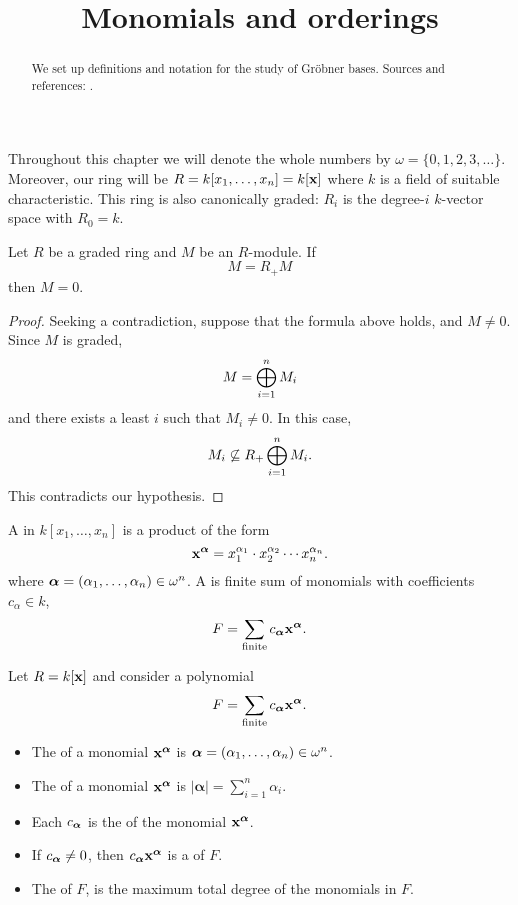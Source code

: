 \documentclass{ximera}
\title{Monomials and orderings}
\begin{document}
\begin{abstract}
  We set up definitions and notation for the study of Gr\"obner 
  bases. Sources and references: \cite{CLO2007}.
\end{abstract}
\maketitle

Throughout this chapter we will denote the whole numbers by $\omega =
\{0,1,2,3,\dots\}$. Moreover, our ring will be $R=k[x_1,\dots,x_n] =
k[\mathbf{x}]$ where $k$ is a field of suitable characteristic. This ring is
also canonically graded: $R_i$ is the degree-$i$ $k$-vector space with
$R_0=k$.

\begin{theorem}
  Let $R$ be a graded ring and $M$ be an $R$-module. If
  \[
  M = R_+ M 
  \]
  then $M=0$.
  \begin{proof}
    Seeking a contradiction, suppose that the formula above holds, and
    $M\ne0$. Since $M$ is graded,
    \[
    M = \bigoplus_{i=1}^n M_i
    \]
    and there exists a least $i$ such that $M_i \ne 0$. In this case,
    \[
    M_i \not\subseteq R_+\bigoplus_{i=1}^n M_i.
    \]
    This contradicts our hypothesis.
  \end{proof}
\end{theorem}

\begin{definition}
  A  in $k[x_1,\dots,x_n]$ is a product of the form
  \[
  \mathbf{x}^{{\boldsymbol\alpha}} = x_1^{\alpha_1}\cdot x_2^{\alpha_2}  \cdots x_n^{\alpha_n}.
  \]
  where ${\boldsymbol\alpha} = (\alpha_1,\dots,\alpha_n) \in
  \omega^n$.  A  is finite sum of monomials with
  coefficients $c_\alpha\in k$,
  \[
  F = \sum_{\mathrm{finite}} c_{{\boldsymbol\alpha}} \mathbf{x}^{{\boldsymbol\alpha}}.
  \]
\end{definition}


\begin{definition}
  Let $R = k[\mathbf{x}]$ and consider a polynomial
  \[
  F =  \sum_{\mathrm{finite}} c_{{\boldsymbol\alpha}} \mathbf{x}^{{\boldsymbol\alpha}}.
  \]
  \begin{itemize}
    \item The  of a monomial $\mathbf{x}^{{\boldsymbol\alpha}}$ is
      ${\boldsymbol\alpha}=(\alpha_1,\dots,\alpha_n)\in \omega^n$.
    \item The  of a monomial $\mathbf{x}^{{\boldsymbol\alpha}}$ is
      $|\boldsymbol{\alpha}| = \sum_{i=1}^n \alpha_i$.
    \item Each $c_{{\boldsymbol\alpha}}$ is the  of the
      monomial $\mathbf{x}^{{\boldsymbol\alpha}}$.
    \item If $c_{{\boldsymbol\alpha}} \ne 0$, then
      $c_{{\boldsymbol\alpha}}\mathbf{x}^{{\boldsymbol\alpha}}$ is a  of
      $F$.
    \item The  of $F$, is the maximum total degree
      of the monomials in $F$.
  \end{itemize}
\end{definition}
\end{document}
